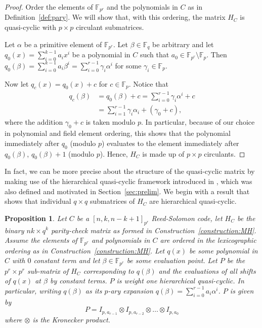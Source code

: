 \documentclass[11pt]{amsart}
\newtheorem{proposition}[theorem]{Proposition}
\theoremstyle{definition}
\newcommand{\0}{\mathbf{0}}
\newcommand{\F}{\mathbb{F}}
\begin{document}
\begin{proof}
    Order the elements of $\F_{p^r}$ and the polynomials in $C$ as in Definition~\ref{def:pary}. We will show that, with this ordering, the matrix $H_C$ is quasi-cyclic with $p \times p$ circulant submatrices.

    Let $\alpha$ be a primitive element of $\F_{p^r}$. Let $\beta \in \F_q$ be arbitrary and let $q_0(x) = \sum_{i=0}^{k-1} a_i x^i$ be a polynomial in $C$ such that $a_0\in \F_{p^{r}}\setminus \F_p$.
    Then $q_0(\beta) = \sum_{i=0}^{k-1} a_i \beta^i = \sum_{i=0}^{r-1} \gamma_i \alpha^i$ for some $\gamma_i \in \F_p$. 

    Now let $q_c(x) = q_0(x) + c$ for $c \in \F_p$. Notice that 
    \begin{align*}
        q_c(\beta) &= q_0(\beta) + c = \sum_{i=0}^{r-1} \gamma_i \alpha^i + c \\
        &=  \sum_{i=1}^{r-1} \gamma_i \alpha_i + (\gamma_0+c),
    \end{align*}
    where the addition $\gamma_0 + c$ is taken modulo $p$. In particular, because of our choice in polynomial and field element ordering, this shows that the polynomial immediately after $q_0$ (modulo $p$) evaluates to the element immediately after $q_0(\beta)$, $q_0(\beta)+1$ (modulo $p$). Hence, $H_C$ is made up of $p \times p$ circulants.
\end{proof}

In fact, we can be more precise about the structure of the quasi-cyclic matrix by making use of the hierarchical quasi-cyclic framework introduced in \cite{wang2013hierarchical}, which was also defined and motivated in Section~\ref{sec:prelim}. We begin with a result that shows that individual $q\times q$ submatrices of $H_C$ are hierarchical quasi-cyclic.

\begin{proposition} \label{prop:hqc-matrices}
    Let $C$ be a $[n,k,n-k+1]_{p^r}$ Reed-Solomon code, let $H_C$ be the binary $nk\times q^k$ parity-check matrix as formed in Construction~\ref{construction:MH}. Assume the elements of $\F_{p^r}$ and polynomials in $C$ are ordered in the lexicographic ordering as in Construction~\ref{construction:MH}. Let $q(x)$ be some polynomial in $C$ with $0$ constant term and let $\beta \in \F_{p^r}$ be some evaluation point. Let $P$ be the $p^r \times p^r$ sub-matrix of $H_C$ corresponding to $q(\beta)$ and the evaluations of all shifts of $q(x)$ at $\beta$ by constant terms. $P$ is weight one hierarchical quasi-cyclic. In particular, writing $q(\beta)$ as its $p$-ary expansion $q(\beta) = \sum_{i=0}^{r-1} a_i \alpha^i$. $P$ is given by
    \[P = I_{p,a_{r-1}} \otimes I_{p,a_{r-2}} \otimes \dots \otimes I_{p,a_0}\]
    where $\otimes$ is the Kronecker product.
\end{proposition}
\end{document}
